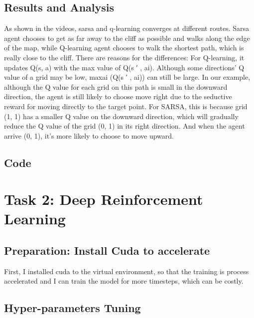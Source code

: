 \documentclass[aps,letterpaper,10pt]{revtex4}
\begin{document}
\subsection{Results and Analysis}
As shown in the videos, sarsa and q-learning converges at different routes. Sarsa agent chooses to get as far away to the cliff as possible and walks along the edge of the map, while Q-learning agent chooses to walk the shortest path, which is really close to the cliff.
There are reasons for the differences:
For Q-learning, it updates Q(s, a) with the max value of Q(s
′
, ai). Although some directions’ Q value of
a grid may be low, maxai
(Q(s
′
, ai)) can still be large. In our example, although the Q value for each grid
on this path is small in the downward direction, the agent is still likely to choose move right due to the
seductive reward for moving directly to the target point.
For SARSA, this is because grid (1, 1) has a smaller Q value on the downward direction, which will
gradually reduce the Q value of the grid (0, 1) in its right direction. And when the agent arrive (0, 1), it’s
more likely to choose to move upward.

\subsection{Code}
\vspace{5mm}
	
	\vspace{3mm}



\newpage
\section{Task 2: Deep Reinforcement Learning}


\subsection{Preparation: Install Cuda to accelerate}
First, I installed cuda to the virtual environment, so that the training is process accelerated and I can train the model for more timesteps, which can be costly.
\vspace{3mm} 
\subsection{Hyper-parameters Tuning}
\end{document}
